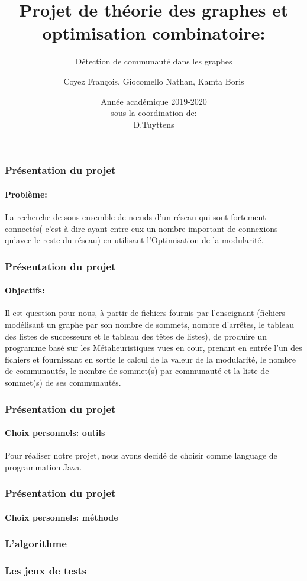 \documentclass{beamer}
\begin{document}
 
\title{Projet de théorie des graphes et optimisation combinatoire:}
\subtitle[\ldots]{Détection de communauté dans les graphes}
\author{Coyez François, Giocomello Nathan, Kamta Boris}
\date{Année académique 2019-2020\\sous la coordination de:\\ D.Tuyttens}
\maketitle
 
 \begin{frame} %
\frametitle{Pr\'esentation du projet} %
\framesubtitle{Probl\`eme:} %
La recherche de sous-ensemble de nœuds d'un r\'eseau qui sont fortement connect\'es( c’est-\`a-dire ayant entre eux un nombre important de connexions qu’avec le reste du r\'eseau) en utilisant l'Optimisation de la modularit\'e.
\end{frame} %

\begin{frame} %
\frametitle{Présentation du projet} %
\framesubtitle{Objectifs:} %
Il est question pour nous, \`a partir de fichiers fournis par l'enseignant (fichiers mod\'elisant un graphe par son nombre de sommets, nombre d'arr\^etes, le tableau des listes de successeurs et le tableau des têtes de listes), de produire un programme basé sur les M\'etaheuristiques vues en cour, prenant en entrée l'un des fichiers et fournissant en sortie le calcul de la valeur de la modularit\'e, le nombre de communaut\'es, le nombre de sommet(s) par communaut\'e et la liste de sommet(s) de ses communaut\'es.
\end{frame} %

\begin{frame} %
\frametitle{Présentation du projet} %
\framesubtitle{Choix personnels: outils} %
Pour r\'ealiser notre projet, nous avons decidé de choisir comme language de programmation Java.
\end{frame} %

\begin{frame} %
\frametitle{Présentation du projet} %
\framesubtitle{Choix personnels: m\'ethode} %

\end{frame} %
 

\begin{frame} %
\frametitle{L’algorithme} %

\end{frame} %


\begin{frame} %
\frametitle{Les jeux de tests} %

\end{frame} %


 
\end{document}
